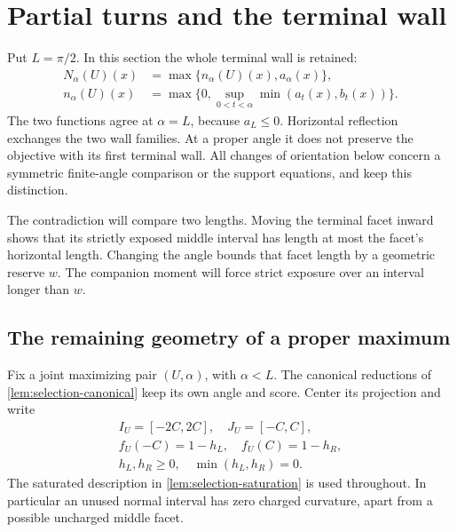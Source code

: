 \section{Partial turns and the terminal wall}\label{sec:partial-turn}

Put $L=\pi/2$. In this section the whole terminal wall is retained:
\[
 \begin{aligned}
 N_\alpha(U)(x)&=\max\{n_\alpha(U)(x),a_\alpha(x)\},\\
 n_\alpha(U)(x)&=\max\{0,\sup_{0<t<\alpha}\min(a_t(x),b_t(x))\}.
 \end{aligned}
\]
The two functions agree at $\alpha=L$, because $a_L\le0$.
Horizontal reflection exchanges the two wall families. At a proper
angle it does not preserve the objective with its first terminal wall.
All changes of orientation below concern a symmetric finite-angle
comparison or the support equations, and keep this distinction.

The contradiction will compare two lengths. Moving the terminal facet
inward shows that its strictly exposed middle interval has length at
most the facet's horizontal length. Changing the angle bounds that facet
length by a geometric reserve $w$. The companion moment will force
strict exposure over an interval longer than $w$.

\subsection{The remaining geometry of a proper maximum}

Fix a joint maximizing pair $(U,\alpha)$, with $\alpha<L$.
The canonical reductions of \cref{lem:selection-canonical} keep its
own angle and score. Center its projection and write
\[
 \begin{gathered}
 I_U=[-2C,2C],\quad J_U=[-C,C],\\
 f_U(-C)=1-h_L,\quad f_U(C)=1-h_R,\\
 h_L,h_R\ge0,\quad\min(h_L,h_R)=0.
 \end{gathered}
\]
The saturated description in \cref{lem:selection-saturation} is used
throughout. In particular an unused normal interval has zero charged
curvature, apart from a possible uncharged middle facet.

